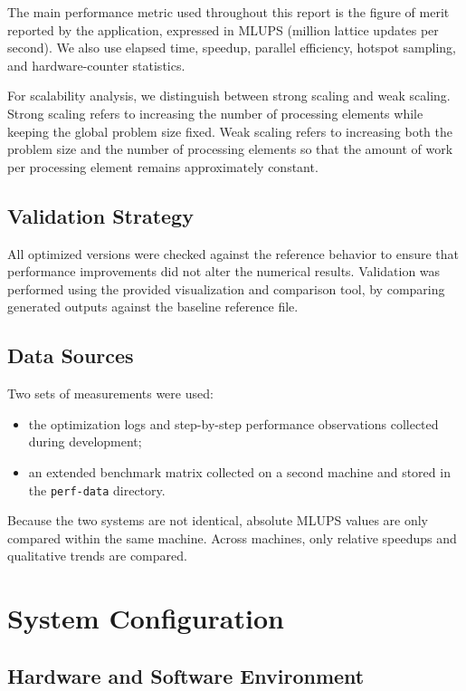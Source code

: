 \documentclass[11pt,a4paper]{article}
\begin{document}
The main performance metric used throughout this report is the figure of merit reported by the application, expressed in MLUPS (million lattice updates per second). We also use elapsed time, speedup, parallel efficiency, hotspot sampling, and hardware-counter statistics.

For scalability analysis, we distinguish between strong scaling and weak scaling. Strong scaling refers to increasing the number of processing elements while keeping the global problem size fixed. Weak scaling refers to increasing both the problem size and the number of processing elements so that the amount of work per processing element remains approximately constant.

\subsection{Validation Strategy}

All optimized versions were checked against the reference behavior to ensure that performance improvements did not alter the numerical results. Validation was performed using the provided visualization and comparison tool, by comparing generated outputs against the baseline reference file.

\subsection{Data Sources}

Two sets of measurements were used:
\begin{itemize}[leftmargin=1.5em]
  \item the optimization logs and step-by-step performance observations collected during development;
  \item an extended benchmark matrix collected on a second machine and stored in the \texttt{perf-data} directory.
\end{itemize}

Because the two systems are not identical, absolute MLUPS values are only compared within the same machine. Across machines, only relative speedups and qualitative trends are compared.

\section{System Configuration}

\subsection{Hardware and Software Environment}
\end{document}
